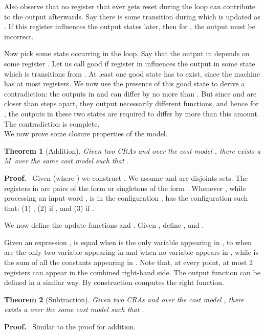 \documentclass[11pt]{article}
\newtheorem{theorem}{Theorem}
\def\Proof{{\bf Proof.}}
\def\qed{{\bf }}
\def\qed{{\bf }}
\newcommand{\edwa}{\ensuremath{M}}
\newcommand{\jyo}[1]{}
\begin{document}
Also observe that no register that ever gets reset during the loop can
contribute to the output afterwards. Say there is some transition
during which  is updated as . If this register
influences the output  states later, then for , the output must be incorrect.

Now pick some state  occurring in the loop. Say that the output in
 depends on some register . Let us call  good if register
 in  influences the output in some state  which
is  transitions from . At least one good state has to exist,
since the machine has at most  registers. We now use the presence
of this good state to derive a contradiction: the outputs in  and
 can differ by no more than . But since  and
 are closer than  steps apart, they output necessarily
different functions, and hence for , the outputs in
these two states are required to differ by more than this amount. The
contradiction is complete.
\qed \\

We now prove some closure properties of the model.

\begin{theorem}[Addition]
Given two CRAs  and  over the cost model ,
there exists a \edwa~over the same cost model such that  .
\end{theorem}

\Proof~ Given  (where
) we construct . We assume  and
 are disjoints sets.  The registers in  are
pairs of the form  or singletons of the form .  Whenever
, while processing an input word , is in the configuration
,  has the configuration
 such that:
(1) ,
(2)  if , and
(3)  if .

We now define the update functions  and .
Given , define
,
and
.

Given an expression ,  is equal 
when  is the only variable appearing in , to  when
 are the only two variable
appearing in  and  when no variable appears in ,
while  is the sum of all the constants appearing in .  Note
that, at every point, at most 2 registers can appear in the combined
right-hand side.  The output function can be defined in a similar way.
\jyo{We need a little more explanation here.} By construction 
computes the right function.
\qed

\begin{theorem}[Subtraction]\label{subtraction}
Given two CRAs  and  over the cost model ,
there exists a  over the same cost model such that
 .
\end{theorem}
\Proof~ Similar to the proof for addition.
\qed \\
\end{document}
